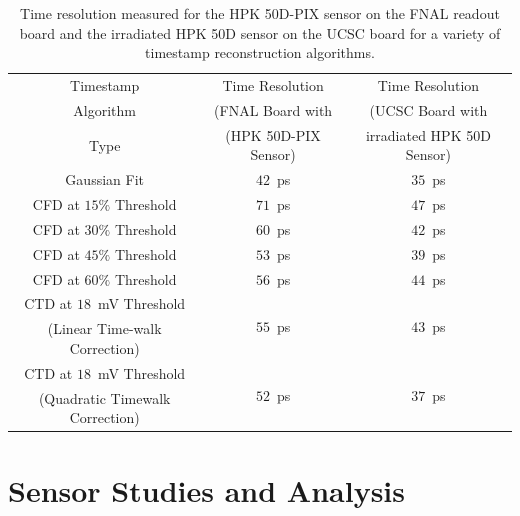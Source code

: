 \documentclass[preprint,1p]{elsarticle}
\begin{document}
\begin{table}[!htb]
\scriptsize
\begin{center}
  \begin{tabular}{ |c | c | c | }
    \hline
    Timestamp   & Time Resolution   & Time Resolution   \\ 
    Algorithm   & (FNAL Board with  & (UCSC Board with   \\ 
    Type        & (HPK 50D-PIX Sensor)  & irradiated HPK 50D Sensor)  \\ \hline 
    Gaussian Fit & $42$~ps & $35$~ps \\ \hline       
    CFD at $15\%$ Threshold & $71$~ps & $47$~ps \\       
    CFD at $30\%$ Threshold & $60$~ps & $42$~ps \\       
    CFD at $45\%$ Threshold & $53$~ps & $39$~ps \\       
    CFD at $60\%$ Threshold & $56$~ps & $44$~ps \\   \hline     
    CTD at $18$~mV Threshold & \multirow{2}{*}{$55$~ps} & \multirow{2}{*}{$43$~ps} \\       
    (Linear Time-walk Correction) & &  \\       
    CTD at $18$~mV Threshold & \multirow{2}{*}{$52$~ps} & \multirow{2}{*}{$37$~ps} \\       
    (Quadratic Timewalk Correction) & &  \\       
    \hline
  \end{tabular}
\caption{Time resolution measured for the HPK 50D-PIX sensor on the FNAL readout board
and the irradiated HPK 50D sensor on the UCSC board for a variety of timestamp reconstruction
algorithms.}  
\label{tab:FNALUCSCBoardTimestampRecoStudy}
\end{center}
\end{table}




\section{Sensor Studies and Analysis}
\label{sec:results}
\end{document}
